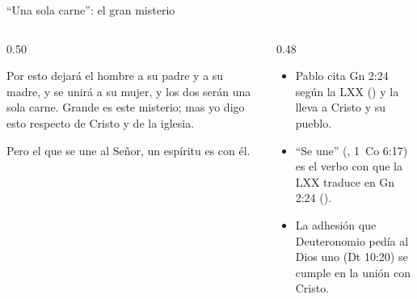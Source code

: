 \begin{frame}{``Una sola carne'': el gran misterio}
\begin{columns}[t,onlytextwidth]
\begin{column}{0.50\textwidth}
\begin{cita}[fontupper=\scriptsize\itshape]Por esto dejará el hombre a su padre y a su madre, y se unirá a su mujer, y los dos serán una sola carne. Grande es este misterio; mas yo digo esto respecto de Cristo y de la iglesia.\end{cita}
\begin{cita}[fontupper=\scriptsize\itshape]Pero el que se une al Señor, un espíritu es con él.\end{cita}
\end{column}
\begin{column}{0.48\textwidth}\small
\begin{itemize}
\item Pablo cita Gn 2:24 según la LXX () y la lleva a Cristo y su pueblo.
\item ``Se une'' (, 1~Co 6:17) es el verbo con que la LXX traduce  en Gn 2:24 ().
\item La adhesión que Deuteronomio pedía al Dios uno (Dt 10:20) se cumple en la unión con Cristo.
\end{itemize}
\end{column}
\end{columns}\par\smallskip
{}
\end{frame}

